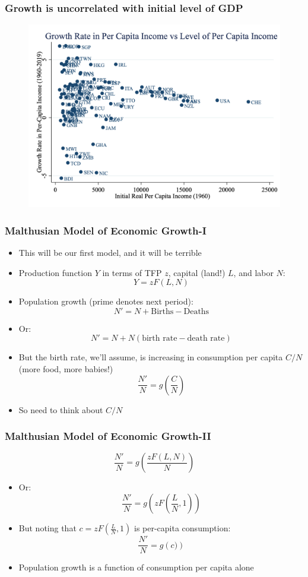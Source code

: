 \documentclass{beamer}
\begin{document}
\begin{frame}
\frametitle[alignment=center]{Growth is uncorrelated with initial level of GDP}
\begin{figure}
\centering
\includegraphics[scale=0.25]{Figures/Fig_7pt3a.png}
\end{figure}
\end{frame}

\begin{frame}
\frametitle[alignment=center]{Malthusian Model of Economic Growth-I}
\begin{itemize}
\item This will be our first model, and it will be terrible
\bigskip
\item Production function $Y$ in terms of TFP $z$, capital (land!) $L$, and labor $N$:
$$Y=zF(L,N)$$
\item Population growth (prime denotes next period):
$$N'=N+\text{Births}-\text{Deaths}$$
\item Or:
$$N'=N+N(\text{birth rate}-\text{death rate})$$
\item But the birth rate, we'll assume, is increasing in consumption per capita $C/N$ (more food, more babies!)
$$\frac{N'}{N}=g\left(\frac{C}{N}\right)$$
\item So need to think about $C/N$
\end{itemize}
\end{frame}

\begin{frame}
\frametitle[alignment=center]{Malthusian Model of Economic Growth-II}
$$\frac{N'}{N}=g\left(\frac{zF(L,N)}{N}\right)$$
\begin{itemize}
\item Or:
$$\frac{N'}{N}=g\left(zF(\frac{L}{N},1)\right)$$
\item But noting that $c=zF(\frac{L}{N},1)$ is per-capita consumption:
$$\frac{N'}{N}=g\left(c)\right)$$
\item Population growth is a function of consumption per capita alone
\end{itemize}
\end{frame}
\end{document}
